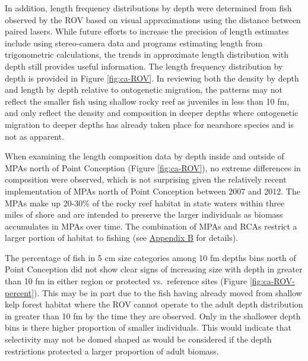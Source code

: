 \documentclass[11pt,
  english,
  a4paper,
]{article}
\begin{document}
\leavevmode\tagmcend\tagstructend\par


In addition, length frequency distributions by depth were determined from fish observed by the ROV based on visual approximations using the distance between paired lasers. While future efforts to increase the precision of length estimates include using stereo-camera data and programs estimating length from trigonometric calculations, the trends in approximate length distribution with depth still provides useful information. The length frequency distribution by depth is provided in Figure \ref{fig:ca-ROV}. In reviewing both the density by depth and length by depth relative to ontogenetic migration, the patterns may not reflect the smaller fish using shallow rocky reef as juveniles in less than 10 fm, and only reflect the density and composition in deeper depths where ontogenetic migration to deeper depths has already taken place for nearshore species and is not as apparent.

\leavevmode\tagmcend\tagstructend\par


When examining the length composition data by depth inside and outside of MPAs north of Point Conception (Figure \ref{fig:ca-ROV}), no extreme differences in composition were observed, which is not surprising given the relatively recent implementation of MPAs north of Point Conception between 2007 and 2012. The MPAs make up 20-30\% of the rocky reef habitat in state waters within three miles of shore and are intended to preserve the larger individuals as biomass accumulates in MPAs over time. The combination of MPAs and RCAs restrict a larger portion of habitat to fishing (see {\protect\hyperlink{append_b}{Appendix B}\leavevmode\tagmcend\tagstructend} for details).

\leavevmode\tagmcend\tagstructend\par


The percentage of fish in 5 cm size categories among 10 fm depths bins north of Point Conception did not show clear signs of increasing size with depth in greater than 10 fm in either region or protected vs.~reference sites (Figure \ref{fig:ca-ROV-percent}). This may be in part due to the fish having already moved from shallow kelp forest habitat where the ROV cannot operate to the adult depth distribution in greater than 10 fm by the time they are observed. Only in the shallower depth bins is there higher proportion of smaller individuals. This would indicate that selectivity may not be domed shaped as would be considered if the depth restrictions protected a larger proportion of adult biomass.
\end{document}
